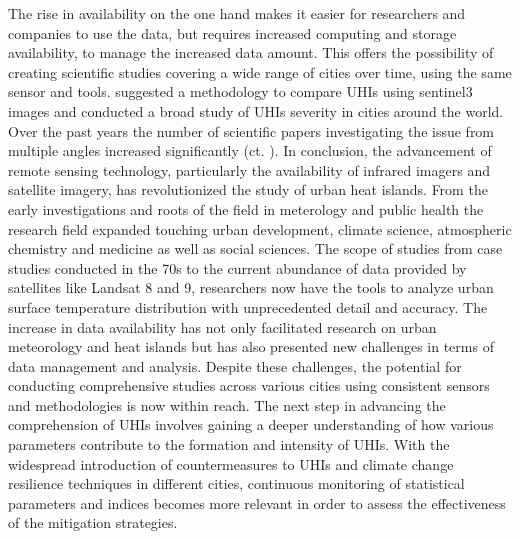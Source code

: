 \documentclass[12pt,a4paper, english]{article}
\begin{document}
  The rise in availability on the one hand makes it easier for researchers and companies to use the data, but requires increased computing and storage availability, to manage the increased data amount.
  This offers the possibility of creating scientific studies covering a wide range of cities over time, using the same sensor and tools. 
  \Cite{Sobrino2020} suggested a methodology to compare \glspl{UHI} using \gls{sentinel3} images and conducted a broad study of \glspl{UHI} severity in cities around the world. 
  Over the past years the number of scientific papers investigating the issue from multiple angles increased significantly (ct. \cite[P. 3]{Piracha2022b}).
In conclusion, the advancement of remote sensing technology, particularly the availability of infrared imagers and satellite imagery, has revolutionized the study of urban heat islands. 
From the early investigations and roots of the field in meterology and public health the research field expanded touching urban development, climate science, atmospheric chemistry and medicine as well as social sciences.
The scope of studies from case studies conducted in the 70s to the current abundance of data provided by satellites like Landsat 8 and 9, researchers now have the tools to analyze urban surface temperature distribution with unprecedented detail and accuracy.
The increase in data availability has not only facilitated research on urban meteorology and heat islands but has also presented new challenges in terms of data management and analysis.
Despite these challenges, the potential for conducting comprehensive studies across various cities using consistent sensors and methodologies is now within reach.
The next step in advancing the comprehension of \glspl{UHI} involves gaining a deeper understanding of how various parameters contribute to the formation and intensity of \glspl{UHI}.
With the widespread introduction of countermeasures to \glspl{UHI} and climate change resilience techniques in different cities, continuous monitoring of statistical parameters and indices becomes more relevant in order to assess the effectiveness of the mitigation strategies. 
\end{document}
